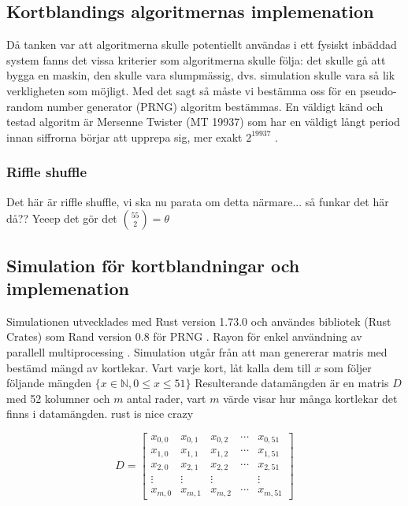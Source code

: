 \documentclass[swedish,a4paper]{article}
\begin{document}
\subsection{Kortblandings algoritmernas implemenation}

Då tanken var att  algoritmerna skulle potentiellt användas i ett fysiskt
inbäddad system fanns det vissa  kriterier som algoritmerna skulle följa: det
skulle gå att bygga en maskin, den skulle vara slumpmässig, dvs. simulation
skulle vara så lik verkligheten som möjligt. Med det sagt så måste vi bestämma
oss för en pseudo-random number generator (PRNG) algoritm bestämmas. En väldigt
känd och testad algoritm är Mersenne Twister (MT 19937) som har en väldigt långt
period innan siffrorna börjar att upprepa sig, mer exakt $2^{19937}$ \parencite{mersenne_twister}.

\subsubsection{Riffle shuffle}
Det här är riffle shuffle, vi ska nu parata om detta närmare...
så funkar det här då?? Yeeep det gör det $\binom{55}{2} = \theta$
\subsection{Simulation för kortblandningar och implemenation}

Simulationen utvecklades med Rust version 1.73.0 och användes bibliotek (Rust
Crates) som Rand version 0.8 för PRNG \parencite{rand_crate}. Rayon för enkel
användning av  parallell multiprocessing \parencite{rayon_crate}. Simulation
utgår från att man genererar matris med bestämd mängd av kortlekar. Vart varje
kort, låt kalla dem till $x$ som följer följande mängden $\{x \in \mathbb{N},  0 \leq x \leq 51 \}$
Resulterande datamängden är en matris $D$ med 52 kolumner och $m$ antal rader, vart
$m$ värde visar hur många kortlekar det finns i datamängden.
rust is nice crazy

\begin{equation*}
	D = \begin{bmatrix}
		x_{0,0} & x_{0,1} & x_{0,2} & \cdots & x_{0,51}\\ 
		x_{1,0} & x_{1,1} & x_{1,2} & \cdots & x_{1,51}\\
		x_{2,0} & x_{2,1} & x_{2,2} & \cdots & x_{2,51}\\
		\vdots & \vdots & \vdots & \; & \vdots \\
		x_{m,0} & x_{m,1} & x_{m,2} & \cdots & x_{m,51}
	\end{bmatrix}
\end{equation*}
\end{document}
